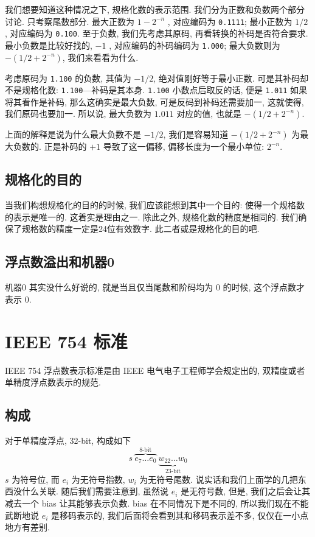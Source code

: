 \documentclass[12pt]{ctexart}
\theoremstyle{definition}
\theoremstyle{plain}
\begin{document}
我们想要知道这种情况之下, 规格化数的表示范围. 我们分为正数和负数两个部分讨论. 只考察尾数部分. 
最大正数为 \(1 - 2 ^{-n}\) , 对应编码为 \texttt{0.1111}; 最小正数为 \(1/2\) , 对应编码为 \texttt{0.100}. 至于负数, 我们先考虑其原码, 再看转换的补码是否符合要求. 最小负数是比较好找的, \(-1\) , 对应编码的补码编码为 \texttt{1.000}; 最大负数则为 \(- (1/2 + 2 ^{-n})\), 我们来看看为什么. 

考虑原码为 \texttt{1.100} 的负数, 其值为 \(-1/2\), 绝对值刚好等于最小正数. 可是其补码却不是规格化数: \texttt{1.100}---补码是其本身. \texttt{1.100} 小数点后取反的话, 便是 \texttt{1.011} 如果将其看作是补码, 那么这确实是最大负数, 可是反码到补码还需要加一, 这就使得, 我们原码也要加一. 所以说, 最大负数为 \(1.011\) 对应的值, 也就是 \(-(1/2 + 2^{-n})\). 

上面的解释是说为什么最大负数不是 \(-1/2\), 我们是容易知道 \(-(1/2 + 2 ^{-n})\) 为最大负数的. 正是补码的 \(+1\) 导致了这一偏移, 偏移长度为一个最小单位: \(2 ^{-n}\). 
\subsection{规格化的目的}
当我们构想规格化的目的的时候, 我们应该能想到其中一个目的: 使得一个规格数的表示是唯一的. 这着实是理由之一. 除此之外, 规格化数的精度是相同的. 我们确保了规格数的精度一定是24位有效数字. 此二者或是规格化的目的吧. 
\subsection{浮点数溢出和机器0}
机器0 其实没什么好说的, 就是当且仅当尾数和阶码均为 \(0\) 的时候, 这个浮点数才表示 \(0\). 

\section{IEEE 754 标准}
IEEE 754 浮点数表示标准是由 IEEE 电气电子工程师学会规定出的, 双精度或者单精度浮点数表示的规范. 
\subsection{构成}
对于单精度浮点, 32-bit, 构成如下
\begin{equation}
s\ \overbrace{e_{7}\dots e_{0}}^{\text{8-bit}}\ \underbrace{w_{22}\dots w_{0}} _{\text{23-bit}}
\end{equation}
\(s\) 为符号位, 而 \(e_{i}\) 为无符号指数, \(w_{i}\) 为无符号尾数. 说实话和我们上面学的几把东西没什么关联. 随后我们需要注意到, 虽然说 \(e_{i}\) 是无符号数, 但是, 我们之后会让其减去一个 bias 让其能够表示负数. bias 在不同情况下是不同的, 所以我们现在不能武断地说 \(e_{i}\) 是移码表示的, 我们后面将会看到其和移码表示差不多, 仅仅在一小点地方有差别. 
\end{document}
